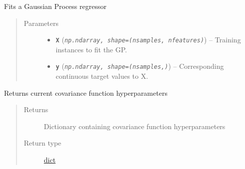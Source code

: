 \documentclass[letterpaper,10pt,english]{sphinxmanual}
\begin{document}
\begin{fulllineitems}
\begin{fulllineitems}
\label{pyGPGO.surrogates.GaussianProcess:pyGPGO.surrogates.GaussianProcess.GaussianProcess.fit}
Fits a Gaussian Process regressor
\begin{quote}\begin{description}
\item[{Parameters}] \leavevmode\begin{itemize}
\item {} 
\textbf{\texttt{X}} (\emph{\texttt{np.ndarray, shape=(nsamples, nfeatures)}}) -- Training instances to fit the GP.

\item {} 
\textbf{\texttt{y}} (\emph{\texttt{np.ndarray, shape=(nsamples,)}}) -- Corresponding continuous target values to X.

\end{itemize}

\end{description}\end{quote}

\end{fulllineitems}


\begin{fulllineitems}
\label{pyGPGO.surrogates.GaussianProcess:pyGPGO.surrogates.GaussianProcess.GaussianProcess.getcovparams}
Returns current covariance function hyperparameters
\begin{quote}\begin{description}
\item[{Returns}] \leavevmode
Dictionary containing covariance function hyperparameters

\item[{Return type}] \leavevmode
\href{https://docs.python.org/2/library/stdtypes.html\#dict}{dict}

\end{description}\end{quote}

\end{fulllineitems}



\end{fulllineitems}
\end{document}
